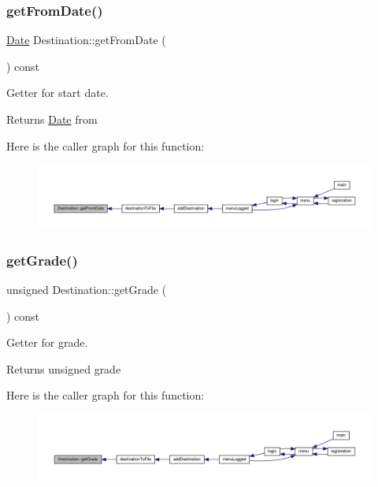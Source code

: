 \subsubsection{\texorpdfstring{get\+From\+Date()}{getFromDate()}}
{\footnotesize\ttfamily \hyperlink{class_date}{Date} Destination\+::get\+From\+Date (\begin{DoxyParamCaption}{ }\end{DoxyParamCaption}) const\hspace{0.3cm}{\ttfamily [inline]}}

Getter for start date. \begin{DoxyReturn}{Returns}
\hyperlink{class_date}{Date} from 
\end{DoxyReturn}
Here is the caller graph for this function\+:\nopagebreak
\begin{figure}[H]
\begin{center}
\leavevmode
\includegraphics[width=350pt]{class_destination_ac6265579620a20899f5e4cf817d037c8_icgraph}
\end{center}
\end{figure}
\mbox{\label{class_destination_a34dd7a2072743078d5067d336dc3c25d}} 
\subsubsection{\texorpdfstring{get\+Grade()}{getGrade()}}
{\footnotesize\ttfamily unsigned Destination\+::get\+Grade (\begin{DoxyParamCaption}{ }\end{DoxyParamCaption}) const\hspace{0.3cm}{\ttfamily [inline]}}

Getter for grade. \begin{DoxyReturn}{Returns}
unsigned grade 
\end{DoxyReturn}
Here is the caller graph for this function\+:\nopagebreak
\begin{figure}[H]
\begin{center}
\leavevmode
\includegraphics[width=350pt]{class_destination_a34dd7a2072743078d5067d336dc3c25d_icgraph}
\end{center}
\end{figure}
\mbox{\label{class_destination_ade746815624a6fd5add31a3475e04b45}} 
